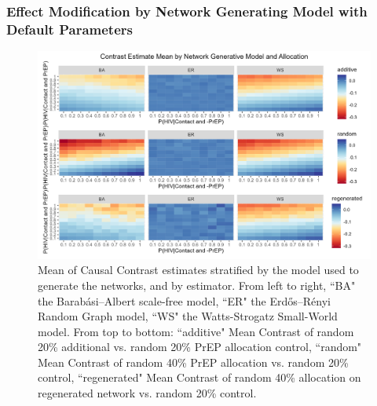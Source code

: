 \documentclass{article}
\theoremstyle{definition}
\begin{document}
\subsubsection{Effect Modification by Network Generating Model with Default Parameters}
\begin{figure}[H]
    \centering
    \includegraphics[scale=0.75]{Figures/Generative Model Mean plots.png}
    \caption{Mean of Causal Contrast estimates stratified by the model used to generate the networks, and by estimator. From left to right, ``BA" the Barabási–Albert scale-free model, ``ER" the Erdős–Rényi Random Graph model, ``WS" the Watts-Strogatz Small-World model. From top to bottom: ``additive" Mean Contrast of random 20\% additional vs. random 20\% PrEP allocation control, ``random" Mean Contrast of random 40\% PrEP allocation vs. random 20\% control, ``regenerated" Mean Contrast of random 40\% allocation on regenerated network vs. random 20\% control. }
    \label{fig:Figure 23}
\end{figure}
\end{document}
